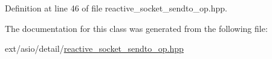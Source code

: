 Definition at line 46 of file reactive\+\_\+socket\+\_\+sendto\+\_\+op.\+hpp.



The documentation for this class was generated from the following file\+:\begin{DoxyCompactItemize}
\item 
ext/asio/detail/\hyperlink{reactive__socket__sendto__op_8hpp}{reactive\+\_\+socket\+\_\+sendto\+\_\+op.\+hpp}\end{DoxyCompactItemize}

